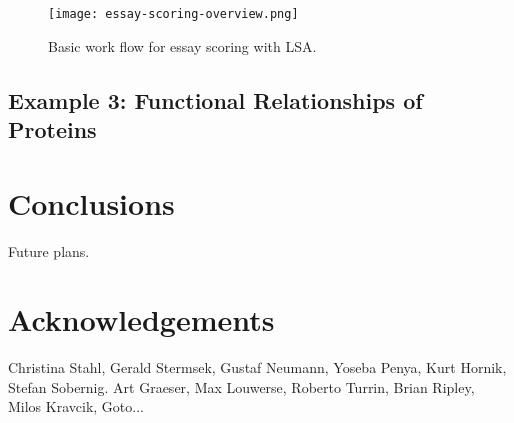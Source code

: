\documentclass[article]{jss}
\begin{document}
\begin{figure}\label{fig:essayscoring}
  \centering
  \texttt{[image: essay-scoring-overview.png]}
  \caption{Basic work flow for essay scoring with LSA.}
\end{figure}


\subsection[example classification]{Example 3: Functional Relationships of Proteins}




\section[conclusions]{Conclusions}

Future plans.

\section[acknowledgements]{Acknowledgements}

Christina Stahl, Gerald Stermsek, Gustaf Neumann, Yoseba Penya, Kurt Hornik, Stefan Sobernig.
Art Graeser, Max Louwerse, Roberto Turrin, Brian Ripley, Milos Kravcik, Goto...


\end{document}
